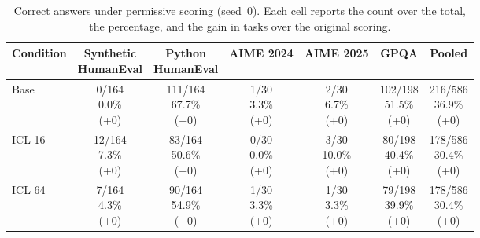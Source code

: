 \begin{table}[htbp]
\centering
\footnotesize
\setlength{\tabcolsep}{7pt}
\renewcommand{\arraystretch}{1.5}
\caption{Correct answers under permissive scoring (seed~0). Each cell reports the count over the total, the percentage, and the gain in tasks over the original scoring.}
\label{tab:generous-seed0-correct}
\begin{tabular}{@{}lcccccc@{}}
\hline
Condition & \shortstack{Synthetic\\[3pt]HumanEval} & \shortstack{Python\\[3pt]HumanEval} & AIME 2024 & AIME 2025 & GPQA & Pooled \\
\hline
Base & \shortstack{0/164\\[3pt]0.0\%\\[3pt](+0)} & \shortstack{111/164\\[3pt]67.7\%\\[3pt](+0)} & \shortstack{1/30\\[3pt]3.3\%\\[3pt](+0)} & \shortstack{2/30\\[3pt]6.7\%\\[3pt](+0)} & \shortstack{102/198\\[3pt]51.5\%\\[3pt](+0)} & \shortstack{216/586\\[3pt]36.9\%\\[3pt](+0)} \\[8pt]
ICL 16 & \shortstack{12/164\\[3pt]7.3\%\\[3pt](+0)} & \shortstack{83/164\\[3pt]50.6\%\\[3pt](+0)} & \shortstack{0/30\\[3pt]0.0\%\\[3pt](+0)} & \shortstack{3/30\\[3pt]10.0\%\\[3pt](+0)} & \shortstack{80/198\\[3pt]40.4\%\\[3pt](+0)} & \shortstack{178/586\\[3pt]30.4\%\\[3pt](+0)} \\[8pt]
ICL 64 & \shortstack{7/164\\[3pt]4.3\%\\[3pt](+0)} & \shortstack{90/164\\[3pt]54.9\%\\[3pt](+0)} & \shortstack{1/30\\[3pt]3.3\%\\[3pt](+0)} & \shortstack{1/30\\[3pt]3.3\%\\[3pt](+0)} & \shortstack{79/198\\[3pt]39.9\%\\[3pt](+0)} & \shortstack{178/586\\[3pt]30.4\%\\[3pt](+0)} \\[8pt]

\end{tabular}
\end{table}
